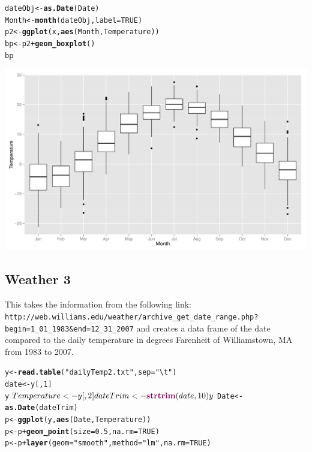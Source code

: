 \documentclass{article}\usepackage{graphicx, color}
\makeatletter
\def\maxwidth{ %
  \ifdim\Gin@nat@width>\linewidth
    \linewidth
  \else
    \Gin@nat@width
  \fi
}
\newcommand{\hlfunctioncall}[1]{\textcolor[rgb]{0.501960784313725,0,0.329411764705882}{\textbf{#1}}}%
\newcommand{\hlstring}[1]{\textcolor[rgb]{0.6,0.6,1}{#1}}%
\newenvironment{kframe}{%
 \def\at@end@of@kframe{}%
 \ifinner\ifhmode%
  \def\at@end@of@kframe{\end{minipage}}%
  \begin{minipage}{\columnwidth}%
 \fi\fi%
 \def\FrameCommand##1{\hskip\@totalleftmargin \hskip-\fboxsep
 \colorbox{shadecolor}{##1}\hskip-\fboxsep
     \hskip-\linewidth \hskip-\@totalleftmargin \hskip\columnwidth}%
 \MakeFramed {\advance\hsize-\width
   \@totalleftmargin\z@ \linewidth\hsize
   \@setminipage}}%
 {\par\unskip\endMakeFramed%
 \at@end@of@kframe}
\newenvironment{knitrout}{}{} %
\makeatother
\begin{document}
\begin{knitrout}
\color{fgcolor}\begin{kframe}
\begin{alltt}
dateObj <- \hlfunctioncall{as.Date}(Date)
Month <- \hlfunctioncall{month}(dateObj, label = TRUE)
p2 <- \hlfunctioncall{ggplot}(x, \hlfunctioncall{aes}(Month, Temperature))
bp <- p2 + \hlfunctioncall{geom_boxplot}()
bp
\end{alltt}
\end{kframe}
\includegraphics[width=\maxwidth]{figure/graph2BoxPlot} 

\end{knitrout}


\subsection*{Weather 3}
This takes the information from the following link:
 \verb+http://web.williams.edu/weather/archive_get_date_range.php?begin=1_01_1983&end=12_31_2007+
and creates a data frame of the date compared to the daily temperature
in degrees Farenheit of Williamstown, MA from 1983 to 2007.

\begin{knitrout}
\color{fgcolor}\begin{kframe}
\begin{alltt}
y <- \hlfunctioncall{read.table}(\hlstring{"dailyTemp2.txt"}, sep = \hlstring{"\textbackslash{}t"})
date <- y[, 1]
y$Temperature <- y[, 2]
dateTrim <- \hlfunctioncall{strtrim}(date, 10)
y$Date <- \hlfunctioncall{as.Date}(dateTrim)
p <- \hlfunctioncall{ggplot}(y, \hlfunctioncall{aes}(Date, Temperature))
p <- p + \hlfunctioncall{geom_point}(size = 0.5, na.rm = TRUE)
p <- p + \hlfunctioncall{layer}(geom = \hlstring{"smooth"}, method = \hlstring{"lm"}, na.rm = TRUE)
\end{alltt}
\end{kframe}
\end{knitrout}
\end{document}
